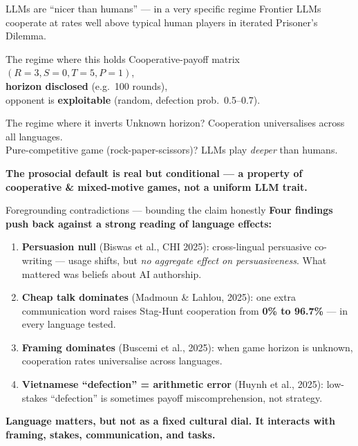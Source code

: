 \documentclass[11pt,aspectratio=169]{beamer}
\newcommand{\takeaway}[1]{%
  \begin{center}
    \colorbox{rsnavy!10}{%
      \begin{minipage}{0.92\textwidth}
        \centering\textbf{#1}
      \end{minipage}}
  \end{center}}
\begin{document}
\begin{frame}{LLMs are ``nicer than humans'' --- in a very specific regime}
    \large
    Frontier LLMs cooperate at rates well above typical human players in iterated Prisoner's Dilemma.
    \vspace{0.3cm}
    \begin{block}{The regime where this holds}
        Cooperative-payoff matrix $(R{=}3, S{=}0, T{=}5, P{=}1)$, \\
        \textbf{horizon disclosed} (e.g.\ 100 rounds), \\
        opponent is \textbf{exploitable} (random, defection prob.\ 0.5--0.7).
    \end{block}
    \vspace{0.3cm}
    \begin{block}{The regime where it inverts}
        Unknown horizon? Cooperation universalises across all languages.\\
        Pure-competitive game (rock-paper-scissors)? LLMs play \emph{deeper} than humans.
    \end{block}
    \vspace{0.3cm}
    \takeaway{The prosocial default is real but conditional --- a property of cooperative \& mixed-motive games, not a uniform LLM trait.}
\end{frame}

\begin{frame}{Foregrounding contradictions --- bounding the claim honestly}
    \large
    \textbf{Four findings push back against a strong reading of language effects:}
    \vspace{0.3cm}
    \normalsize
    \begin{enumerate}
        \setlength\itemsep{0.4em}
        \item \textbf{Persuasion null} (Biswas et al., CHI 2025): cross-lingual persuasive co-writing — usage shifts, but \emph{no aggregate effect on persuasiveness}. What mattered was beliefs about AI authorship.
        \item \textbf{Cheap talk dominates} (Madmoun \& Lahlou, 2025): one extra communication word raises Stag-Hunt cooperation from \textbf{0\% to 96.7\%} --- in every language tested.
        \item \textbf{Framing dominates} (Buscemi et al., 2025): when game horizon is unknown, cooperation rates universalise across languages.
        \item \textbf{Vietnamese ``defection'' = arithmetic error} (Huynh et al., 2025): low-stakes ``defection'' is sometimes payoff miscomprehension, not strategy.
    \end{enumerate}
    \vspace{0.3cm}
    \takeaway{Language matters, but not as a fixed cultural dial. It interacts with framing, stakes, communication, and tasks.}
\end{frame}
\end{document}
